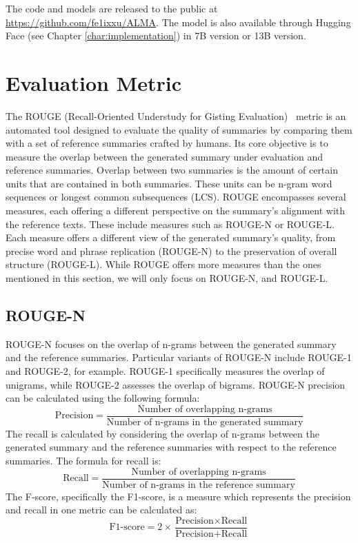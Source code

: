 \documentclass[english, ba, kiv, he, iso690numb, pdf, viewonly]{fasthesis}
\begin{document}
	The code and models are released to the public at \url{https://github.com/fe1ixxu/ALMA}. The model is also available through Hugging Face (see Chapter \ref{char:implementation}) in 7B version or 13B version.
	
	\section{Evaluation Metric}
	The ROUGE (Recall-Oriented Understudy for Gisting Evaluation)~\cite{lin-2004-rouge} metric is an automated tool designed to evaluate the quality of summaries by comparing them with a set of reference summaries crafted by humans. Its core objective is to measure the overlap between the generated summary under evaluation and reference summaries. Overlap between two summaries is the amount of certain units that are contained in both summaries. These units can be n-gram word sequences or longest common subsequences (LCS).
	ROUGE encompasses several measures, each offering a different perspective on the summary's alignment with the reference texts. These include measures such as ROUGE-N or ROUGE-L. Each measure offers a different view of the generated summary's quality, from precise word and phrase replication (ROUGE-N) to the preservation of overall structure (ROUGE-L). While ROUGE offers more measures than the ones mentioned in this section, we will only focus on ROUGE-N, and ROUGE-L.
	\subsection{ROUGE-N}
	ROUGE-N focuses on the overlap of n-grams between the generated summary and the reference summaries. Particular variants of ROUGE-N include ROUGE-1 and ROUGE-2, for example. ROUGE-1 specifically measures the overlap of unigrams, while ROUGE-2 assesses the overlap of bigrams. ROUGE-N precision can be calculated using the following formula:
	$$ \text{Precision} = \frac{\text{Number of overlapping n-grams}}{\text{Number of n-grams in the generated summary}} $$
	The recall is calculated by considering the overlap of n-grams between the generated summary and the reference summaries with respect to the reference summaries. The formula for recall is:
	$$
	\text{Recall} = \frac{\text{Number of overlapping n-grams}}{\text{Number of n-grams in the reference summary}}
	$$
	The F-score, specifically the F1-score, is a measure which represents the precision and recall in one metric can be calculated as:
	$$
	\text{F1-score} = 2 \times \frac{\text{Precision} \times \text{Recall}}{\text{Precision} + \text{Recall}}
	$$
\end{document}
